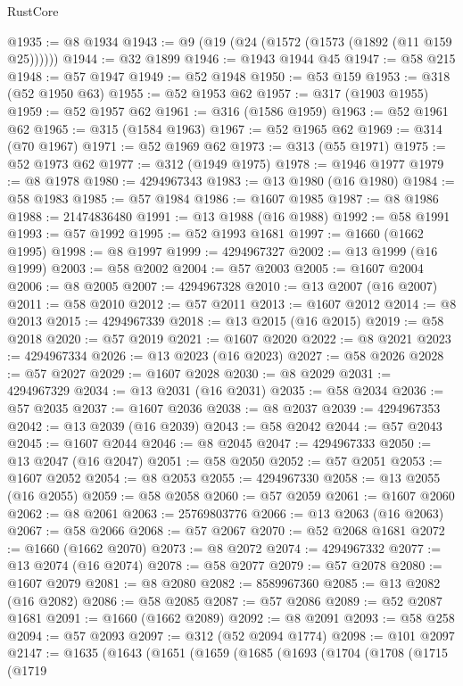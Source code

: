 \begin{lexlean}{RustCore}
\begin{coremodule}
@1935 := @8 @1934
@1943 := @9 (@19 (@24 (@1572 (@1573 (@1892 (@11 @159 @25))))))
@1944 := @32 @1899
@1946 := @1943 @1944 @45
@1947 := @58 @215
@1948 := @57 @1947
@1949 := @52 @1948
@1950 := @53 @159
@1953 := @318 (@52 @1950 @63)
@1955 := @52 @1953 @62
@1957 := @317 (@1903 @1955)
@1959 := @52 @1957 @62
@1961 := @316 (@1586 @1959)
@1963 := @52 @1961 @62
@1965 := @315 (@1584 @1963)
@1967 := @52 @1965 @62
@1969 := @314 (@70 @1967)
@1971 := @52 @1969 @62
@1973 := @313 (@55 @1971)
@1975 := @52 @1973 @62
@1977 := @312 (@1949 @1975)
@1978 := @1946 @1977
@1979 := @8 @1978
@1980 := 4294967343
@1983 := @13 @1980 (@16 @1980)
@1984 := @58 @1983
@1985 := @57 @1984
@1986 := @1607 @1985
@1987 := @8 @1986
@1988 := 21474836480
@1991 := @13 @1988 (@16 @1988)
@1992 := @58 @1991
@1993 := @57 @1992
@1995 := @52 @1993 @1681
@1997 := @1660 (@1662 @1995)
@1998 := @8 @1997
@1999 := 4294967327
@2002 := @13 @1999 (@16 @1999)
@2003 := @58 @2002
@2004 := @57 @2003
@2005 := @1607 @2004
@2006 := @8 @2005
@2007 := 4294967328
@2010 := @13 @2007 (@16 @2007)
@2011 := @58 @2010
@2012 := @57 @2011
@2013 := @1607 @2012
@2014 := @8 @2013
@2015 := 4294967339
@2018 := @13 @2015 (@16 @2015)
@2019 := @58 @2018
@2020 := @57 @2019
@2021 := @1607 @2020
@2022 := @8 @2021
@2023 := 4294967334
@2026 := @13 @2023 (@16 @2023)
@2027 := @58 @2026
@2028 := @57 @2027
@2029 := @1607 @2028
@2030 := @8 @2029
@2031 := 4294967329
@2034 := @13 @2031 (@16 @2031)
@2035 := @58 @2034
@2036 := @57 @2035
@2037 := @1607 @2036
@2038 := @8 @2037
@2039 := 4294967353
@2042 := @13 @2039 (@16 @2039)
@2043 := @58 @2042
@2044 := @57 @2043
@2045 := @1607 @2044
@2046 := @8 @2045
@2047 := 4294967333
@2050 := @13 @2047 (@16 @2047)
@2051 := @58 @2050
@2052 := @57 @2051
@2053 := @1607 @2052
@2054 := @8 @2053
@2055 := 4294967330
@2058 := @13 @2055 (@16 @2055)
@2059 := @58 @2058
@2060 := @57 @2059
@2061 := @1607 @2060
@2062 := @8 @2061
@2063 := 25769803776
@2066 := @13 @2063 (@16 @2063)
@2067 := @58 @2066
@2068 := @57 @2067
@2070 := @52 @2068 @1681
@2072 := @1660 (@1662 @2070)
@2073 := @8 @2072
@2074 := 4294967332
@2077 := @13 @2074 (@16 @2074)
@2078 := @58 @2077
@2079 := @57 @2078
@2080 := @1607 @2079
@2081 := @8 @2080
@2082 := 8589967360
@2085 := @13 @2082 (@16 @2082)
@2086 := @58 @2085
@2087 := @57 @2086
@2089 := @52 @2087 @1681
@2091 := @1660 (@1662 @2089)
@2092 := @8 @2091
@2093 := @58 @258
@2094 := @57 @2093
@2097 := @312 (@52 @2094 @1774)
@2098 := @101 @2097
@2147 := @1635
    (@1643
      (@1651
        (@1659
          (@1685
            (@1693
              (@1704
                (@1708
                  (@1715
                    (@1719

\end{coremodule}
\end{lexlean}
